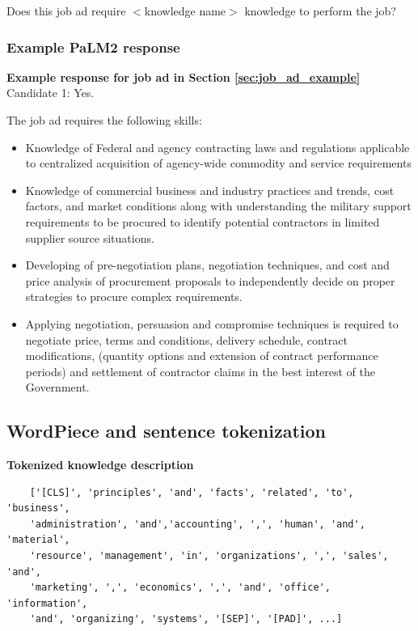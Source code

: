 \documentclass[12pt]{article}
\begin{document}
\noindent Does this job ad require $<$knowledge name$>$ knowledge to perform the job?

\subsubsection{Example PaLM2 response}\label{sec:palm_response}

\textbf{Example response for job ad in Section \ref{sec:job_ad_example}}\\

Candidate 1: Yes.

The job ad requires the following skills:

\begin{itemize}
  \item Knowledge of Federal and agency contracting laws and regulations applicable to centralized acquisition of agency-wide commodity and service requirements
  \item Knowledge of commercial business and industry practices and trends, cost factors, and market conditions along with understanding the military support requirements to be procured to identify potential contractors in limited supplier source situations.
  \item Developing of pre-negotiation plans, negotiation techniques, and cost and price analysis of procurement proposals to independently decide on proper strategies to procure complex requirements.
  \item Applying negotiation, persuasion and compromise techniques is required to negotiate price, terms and conditions, delivery schedule, contract modifications, (quantity options and extension of contract performance periods) and settlement of contractor claims in the best interest of the Government.
\end{itemize}

\clearpage

\subsection{WordPiece and sentence tokenization}\label{sec:wordpiece}

\textbf{Tokenized knowledge description}

\begin{verbatim}
    ['[CLS]', 'principles', 'and', 'facts', 'related', 'to', 'business', 
    'administration', 'and','accounting', ',', 'human', 'and', 'material', 
    'resource', 'management', 'in', 'organizations', ',', 'sales', 'and', 
    'marketing', ',', 'economics', ',', 'and', 'office', 'information', 
    'and', 'organizing', 'systems', '[SEP]', '[PAD]', ...]
\end{verbatim}
    
\end{document}
